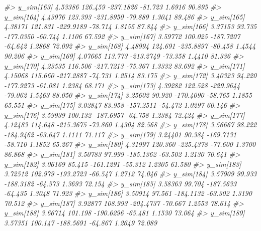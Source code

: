 \documentclass[
  10pt,
  italian,
  a4paper,
  extrafontsizes,onecolumn,openright
  ]{memoir}
\newenvironment{Shaded}{\begin{snugshade}}{\end{snugshade}}
\newcommand{\CommentTok}[1]{\textcolor[rgb]{0.56,0.35,0.01}{\textit{#1}}}
\begin{document}
\begin{Shaded}
\begin{Highlighting}[]
\CommentTok{\#\textgreater{}   y\_sim[163]  4.53386 126.459 {-}237.1826 {-}81.723  1.6916  90.895}
\CommentTok{\#\textgreater{}   y\_sim[164]  4.43976 123.393 {-}231.8950 {-}79.889  1.3041  89.486}
\CommentTok{\#\textgreater{}   y\_sim[165]  4.38171 121.831 {-}229.9189 {-}78.714  1.8155  87.844}
\CommentTok{\#\textgreater{}   y\_sim[166]  3.37153  93.735 {-}177.0350 {-}60.744  1.1106  67.592}
\CommentTok{\#\textgreater{}   y\_sim[167]  3.59772 100.025 {-}187.7207 {-}64.642  1.2868  72.092}
\CommentTok{\#\textgreater{}   y\_sim[168]  4.48994 124.691 {-}235.8897 {-}80.458  1.4544  90.206}
\CommentTok{\#\textgreater{}   y\_sim[169]  4.07665 113.773 {-}213.2749 {-}73.358  1.4410  81.336}
\CommentTok{\#\textgreater{}   y\_sim[170]  4.23535 116.506 {-}217.7213 {-}75.367  1.3332  83.692}
\CommentTok{\#\textgreater{}   y\_sim[171]  4.15068 115.660 {-}217.2887 {-}74.731  1.2514  83.175}
\CommentTok{\#\textgreater{}   y\_sim[172]  3.40323  94.220 {-}177.9273 {-}61.081  1.2384  68.171}
\CommentTok{\#\textgreater{}   y\_sim[173]  4.39282 122.528 {-}229.9644 {-}79.062  1.5463  88.050}
\CommentTok{\#\textgreater{}   y\_sim[174]  3.25602  90.920 {-}170.4090 {-}58.765  1.1855  65.551}
\CommentTok{\#\textgreater{}   y\_sim[175]  3.02847  83.958 {-}157.2511 {-}54.472  1.0297  60.146}
\CommentTok{\#\textgreater{}   y\_sim[176]  3.59939 100.132 {-}187.6957 {-}64.758  1.2384  72.424}
\CommentTok{\#\textgreater{}   y\_sim[177]  4.12483 114.648 {-}215.3675 {-}73.860  1.4304  82.568}
\CommentTok{\#\textgreater{}   y\_sim[178]  3.56667  98.222 {-}184.9462 {-}63.647  1.1111  71.117}
\CommentTok{\#\textgreater{}   y\_sim[179]  3.24401  90.384 {-}169.7131 {-}58.710  1.1852  65.267}
\CommentTok{\#\textgreater{}   y\_sim[180]  4.31997 120.360 {-}225.4378 {-}77.600  1.3700  86.868}
\CommentTok{\#\textgreater{}   y\_sim[181]  3.50783  97.999 {-}185.1362 {-}63.502  1.2130  70.641}
\CommentTok{\#\textgreater{}   y\_sim[182]  3.06169  85.415 {-}161.1291 {-}55.312  1.2305  61.580}
\CommentTok{\#\textgreater{}   y\_sim[183]  3.72512 102.979 {-}193.2723 {-}66.547  1.2712  74.046}
\CommentTok{\#\textgreater{}   y\_sim[184]  3.57909  99.933 {-}188.3182 {-}64.573  1.3693  72.154}
\CommentTok{\#\textgreater{}   y\_sim[185]  3.58363  99.704 {-}187.5633 {-}64.435  1.3048  71.923}
\CommentTok{\#\textgreater{}   y\_sim[186]  3.50914  97.561 {-}184.1132 {-}63.302  1.3190  70.512}
\CommentTok{\#\textgreater{}   y\_sim[187]  3.92877 108.993 {-}204.4737 {-}70.667  1.2553  78.614}
\CommentTok{\#\textgreater{}   y\_sim[188]  3.66714 101.198 {-}190.6296 {-}65.481  1.1530  73.064}
\CommentTok{\#\textgreater{}   y\_sim[189]  3.57351 100.147 {-}188.5691 {-}64.867  1.2649  72.089}

\end{Highlighting}
\end{Shaded}
\end{document}
